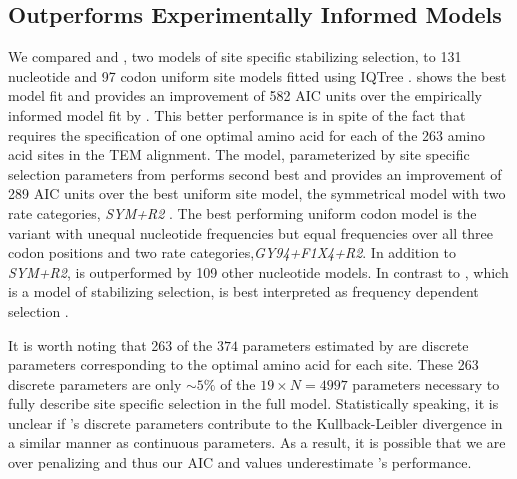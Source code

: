 \documentclass[fleqn,letterpaper]{article}
\begin{document}
\subsection{\selac Outperforms Experimentally Informed Models}
We compared \selac and \phydms, two models of site specific stabilizing selection, to 131 nucleotide and 97 codon uniform site models fitted using IQTree \citep[][see Table \ref{tab:AIC_selac} for the best performing models and Table \ref{tab:AIC_full} for all models]{nguyen2015}.
\selac shows the best model fit and provides an improvement of 582 AIC units over the empirically informed model fit by \phydms.
This better performance is in spite of the fact that \selac requires the specification of one optimal amino acid for each of the 263 amino acid sites in the TEM alignment.
The \phydms model, parameterized by site specific selection parameters from \citet{stiffler2016} performs second best and provides an improvement of 289 AIC units over the best uniform site model, the symmetrical model with two rate categories, \emph{SYM+R2} \citet{zharkikh1994}. 
The best performing uniform codon model is the \gy variant with unequal nucleotide frequencies but equal frequencies over all three codon positions and two rate categories,\emph{GY94+F1X4+R2}. 
In addition to \emph{SYM+R2}, \gy is outperformed by 109 other nucleotide models.
In contrast to \selac, which is a model of stabilizing selection, \gy is best interpreted as frequency dependent selection \citep{HughesAndNei1988,Nowak2006,Hughes2007,beaulieu2019}.

It is worth noting that 263 of the $374$ parameters estimated by \selac are discrete parameters corresponding to the optimal amino acid for each site.
These 263 discrete parameters are only $\sim5\%$ of the $19\times N = 4997$ parameters necessary to fully describe site specific selection in the full \hb model.
Statistically speaking, it is unclear if \selac's discrete parameters contribute to the Kullback-Leibler divergence in a similar manner as continuous parameters.
As a result, it is possible that we are over penalizing \selac and thus our AIC and \DeltaAIC values underestimate \selac's performance.
\end{document}
